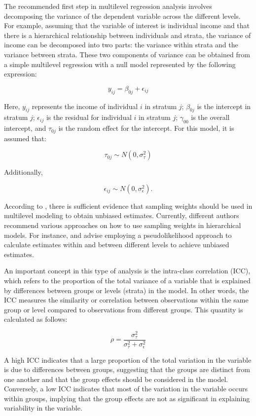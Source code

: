 \documentclass[
  12pt,
]{book}
\begin{document}
The recommended first step in multilevel regression analysis involves decomposing the variance of the dependent variable across the different levels. For example, assuming that the variable of interest is individual income and that there is a hierarchical relationship between individuals and strata, the variance of income can be decomposed into two parts: the variance within strata and the variance between strata. These two components of variance can be obtained from a simple multilevel regression with a null model represented by the following expression:

\[
y_{ij} = \beta_{0j} + \epsilon_{ij}
\]

Here, \(y_{ij}\) represents the income of individual \(i\) in stratum \(j\); \(\beta_{0j}\) is the intercept in stratum \(j\); \(\epsilon_{ij}\) is the residual for individual \(i\) in stratum \(j\); \(\gamma_{00}\) is the overall intercept, and \(\tau_{0j}\) is the random effect for the intercept. For this model, it is assumed that:

\[
\tau_{0j} \sim N(0, \sigma_{\tau}^{2})
\]

Additionally,

\[
\epsilon_{ij} \sim N(0, \sigma_{\epsilon}^{2}).
\]

According to \citet{cai2013investigation}, there is sufficient evidence that sampling weights should be used in multilevel modeling to obtain unbiased estimates. Currently, different authors recommend various approaches on how to use sampling weights in hierarchical models. For instance, \citet{pfeffermann1998weighting} and \citet{asparouhov2006general} advise employing a pseudolikelihood approach to calculate estimates within and between different levels to achieve unbiased estimates.

An important concept in this type of analysis is the intra-class correlation (ICC), which refers to the proportion of the total variance of a variable that is explained by differences between groups or levels (strata) in the model. In other words, the ICC measures the similarity or correlation between observations within the same group or level compared to observations from different groups. This quantity is calculated as follows:

\[
\rho = \frac{\sigma_{\tau}^{2}}{\sigma_{\tau}^{2} + \sigma_{\epsilon}^{2}}
\]

A high ICC indicates that a large proportion of the total variation in the variable is due to differences between groups, suggesting that the groups are distinct from one another and that the group effects should be considered in the model. Conversely, a low ICC indicates that most of the variation in the variable occurs within groups, implying that the group effects are not as significant in explaining variability in the variable.
\end{document}
